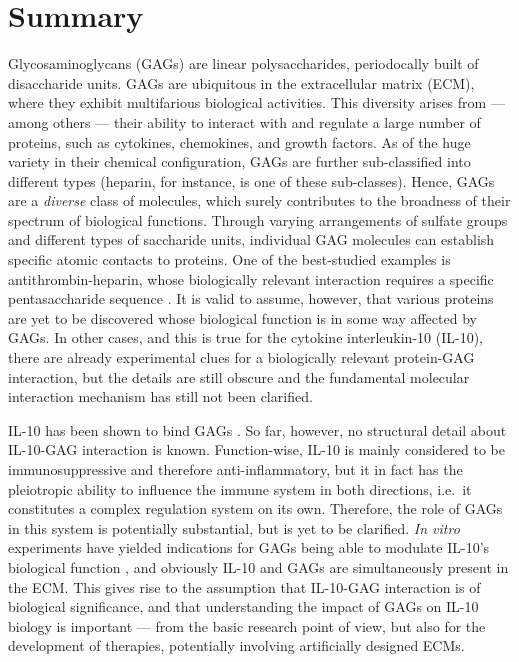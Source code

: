 
\vspace{-1.5cm}

\chapter{Summary}



Glycosaminoglycans (GAGs) are linear polysaccharides, periodocally built of
disaccharide units. GAGs are ubiquitous in the extracellular matrix (ECM), where
they exhibit multifarious biological activities. This diversity arises from ---
among others --- their ability to interact with and regulate a large number of
proteins, such as cytokines, chemokines, and growth factors. As of the huge
variety in their chemical configuration, GAGs are further sub-classified into
different types (heparin, for instance, is one of these sub-classes). Hence,
GAGs are a \textit{diverse} class of molecules, which surely contributes to the
broadness of their spectrum of biological functions. Through varying
arrangements of sulfate groups and different types of saccharide units,
individual GAG molecules can establish specific atomic contacts to proteins. One
of the best-studied examples is antithrombin-heparin, whose biologically
relevant interaction requires a specific pentasaccharide sequence
\cite{antithrombin-thrombin-heparin-2004}. It is valid to assume, however, that
various proteins are yet to be discovered whose biological function is in some
way affected by GAGs. In other cases, and this is true for the cytokine
interleukin-10 (IL-10), there are already experimental clues for a biologically
relevant protein-GAG interaction, but the details are still obscure and the
fundamental molecular interaction mechanism has still not been clarified.

IL-10 has been shown to bind GAGs \cite{salek_ardakani_2000}. So far, however,
no structural detail about IL-10-GAG interaction is known. Function-wise, IL-10
is mainly considered to be immunosuppressive and therefore anti-inflammatory,
but it in fact has the pleiotropic ability to influence the immune system in
both directions, i.e.\ it constitutes a complex regulation system on its own.
Therefore, the role of GAGs in this system is potentially substantial, but is
yet to be clarified. \textit{In vitro} experiments have yielded indications for
GAGs being able to modulate IL-10's biological function
\cite{salek_ardakani_2000}, and obviously IL-10 and GAGs are simultaneously
present in the ECM. This gives rise to the assumption that IL-10-GAG interaction
is of biological significance, and that understanding the impact of GAGs on
IL-10 biology is important --- from the basic research point of view, but also
for the development of therapies, potentially involving artificially designed
ECMs.

